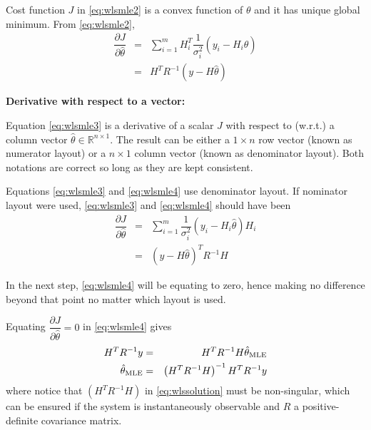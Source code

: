 Cost function $J$ in \eqref{eq:wlsmle2} is a convex function of $\theta$ and it has unique global minimum. From \eqref{eq:wlsmle2}, 
\begin{eqnarray}
	\dfrac{\partial J}{\partial \hat{\theta}} &=& \sum_{i=1}^{m}H_i^T\dfrac{1}{\sigma_i^2} \left(y_i-H_i\hat{\theta}\right) \label{eq:wlsmle3} \\
	&=& H^TR^{-1}\left(y-H\hat{\theta}\right) \label{eq:wlsmle4}
\end{eqnarray}

\begin{mdframed}
	\textbf{Derivative with respect to a vector:}
	
	Equation \eqref{eq:wlsmle3} is a derivative of a scalar $J$ with respect to (w.r.t.) a column vector $\hat{\theta} \in \mathbb{R}^{n\times 1}$. The result can be either a $1\times n$ row vector (known as numerator layout) or a $n\times 1$ column vector (known as denominator layout). Both notations are correct so long as they are kept consistent.
	
	Equations \eqref{eq:wlsmle3} and \eqref{eq:wlsmle4} use denominator layout. If nominator layout were used, \eqref{eq:wlsmle3} and \eqref{eq:wlsmle4} should have been
	\begin{eqnarray}
		\dfrac{\partial J}{\partial \hat{\theta}} &=& \sum_{i=1}^{m}\dfrac{1}{\sigma_i^2} \left(y_i-H_i\hat{\theta}\right)H_i \nonumber \\
		&=& \left(y-H\hat{\theta}\right)^TR^{-1}H \nonumber
	\end{eqnarray}
	
	In the next step, \eqref{eq:wlsmle4} will be equating to zero, hence making no difference beyond that point no matter which layout is used. 
\end{mdframed}

Equating $\dfrac{\partial J}{\partial \hat{\theta}}=0$ in \eqref{eq:wlsmle4} gives
\begin{eqnarray}
	H^TR^{-1}y &=& H^TR^{-1}H\hat{\theta}_{\textup{MLE}} \nonumber \\
	\hat{\theta}_{\textup{MLE}} &=& \left(H^TR^{-1}H\right)^{-1}H^TR^{-1}y \label{eq:wlssolution}
\end{eqnarray}
where notice that $\left(H^TR^{-1}H\right)$ in \eqref{eq:wlssolution} must be non-singular, which can be ensured if the system is instantaneously observable and $R$ a positive-definite covariance matrix. 

